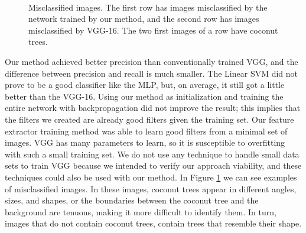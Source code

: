 \documentclass[a4paper,conference]{IEEEtran}
\begin{document}
\begin{figure}
{  }
  ~
  \caption{Misclassified images. The first row has images misclassified by the network trained by our method, and the second row has images misclassified by VGG-16. The two first images of a row have coconut trees.}
  \label{fig:ex-classification}
\end{figure}

Our method achieved better precision than conventionally trained VGG, and the difference between precision and recall is much smaller. The Linear SVM did not prove to be a good classifier like the MLP, but, on average, it still got a little better than the VGG-16. Using our method as initialization and training the entire network with backpropagation did not improve the result; this implies that the filters we created are already good filters given the training set. Our feature extractor training method was able to learn good filters from a minimal set of images. VGG has many parameters to learn, so it is susceptible to overfitting with such a small training set. We do not use any technique to handle small data sets to train VGG because we intended to verify our approach viability, and these techniques could also be used with our method. In Figure \ref{fig:ex-classification} we can see examples of misclassified images. In these images, coconut trees appear in different angles, sizes, and shapes, or the boundaries between the coconut tree and the background are tenuous, making it more difficult to identify them. In turn, images that do not contain coconut trees, contain trees that resemble their shape.
\end{document}
